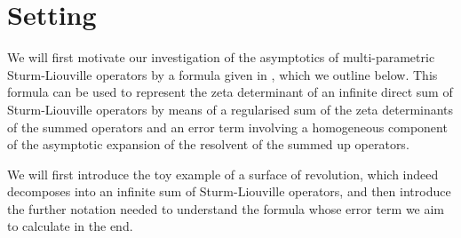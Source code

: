 \section{Setting}
We will first motivate our investigation of the asymptotics of multi-parametric
Sturm-Liouville operators by a formula given in \cite{LV13}, which we outline
below. This formula can be used to represent the zeta determinant of an infinite
direct sum of Sturm-Liouville operators by means of a regularised sum of the
zeta determinants of the summed operators and an error term involving a
homogeneous component of the asymptotic expansion of the resolvent of the summed
up operators.

We will first introduce the toy example of a surface of revolution, which indeed
decomposes into an infinite sum of Sturm-Liouville operators, and then introduce
the further notation needed to understand the formula whose error term we aim
to calculate in the end.

